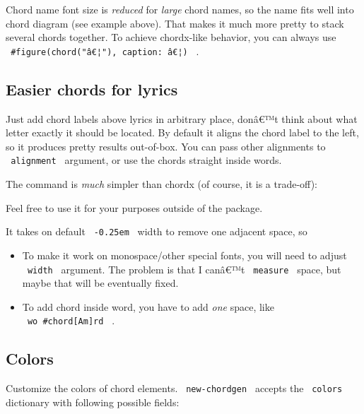 Chord name font size is \emph{reduced} for \emph{large} chord names, so
the name fits well into chord diagram (see example above). That makes it
much more pretty to stack several chords together. To achieve
chordx-like behavior, you can always use
\texttt{\ \#figure(chord("â€¦"),\ caption:\ â€¦)\ } .

\subsection{Easier chords for lyrics}\label{easier-chords-for-lyrics}

Just add chord labels above lyrics in arbitrary place, donâ€™t think
about what letter exactly it should be located. By default it aligns the
chord label to the left, so it produces pretty results out-of-box. You
can pass other alignments to \texttt{\ alignment\ } argument, or use the
chords straight inside words.

The command is \emph{much} simpler than chordx (of course, it is a
trade-off):

\begin{Shaded}
\begin{Highlighting}[]
\end{Highlighting}
\end{Shaded}

Feel free to use it for your purposes outside of the package.

It takes on default \texttt{\ -0.25em\ } width to remove one adjacent
space, so

\begin{itemize}
\tightlist
\item
  To make it work on monospace/other special fonts, you will need to
  adjust \texttt{\ width\ } argument. The problem is that I canâ€™t
  \texttt{\ measure\ } space, but maybe that will be eventually fixed.
\item
  To add chord inside word, you have to add \emph{one} space, like
  \texttt{\ wo\ \#chord{[}Am{]}rd\ } .
\end{itemize}

\subsection{Colors}\label{colors}

Customize the colors of chord elements. \texttt{\ new-chordgen\ }
accepts the \texttt{\ colors\ } dictionary with following possible
fields:

